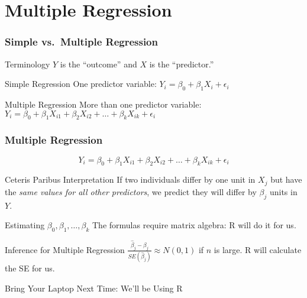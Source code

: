 \section{Multiple Regression}
\begin{frame}
\frametitle{Simple vs.\ Multiple Regression}
\begin{block}{Terminology}
$Y$ is the ``outcome'' and $X$ is the ``predictor.''
\end{block}

\begin{block}{Simple Regression}
One predictor variable: $Y_i = \beta_0 + \beta_1 X_i + \epsilon_i$
\end{block}
\begin{block}{Multiple Regression}
More than one predictor variable: $Y_i = \beta_0 + \beta_1 X_{i1} + \beta_2 X_{i2} +  \hdots + \beta_k X_{ik} + \epsilon_i$
\end{block}



\end{frame}


\begin{frame}
\frametitle{Multiple Regression}
$$Y_i = \beta_0 + \beta_1 X_{i1} + \beta_2 X_{i2} +  \hdots + \beta_k X_{ik} + \epsilon_i$$

\begin{block}{Ceteris Paribus Interpretation}
  If two individuals differ by one unit in $X_j$ but have the \emph{same values for all other predictors}, we predict they will differ by $\beta_j$ units in $Y$.
\end{block}

\begin{block}{Estimating $\beta_0, \beta_1, \dots, \beta_k$}
  The formulas require matrix algebra: R will do it for us.
\end{block}

\begin{block}{Inference for Multiple Regression}
$\displaystyle\frac{\widehat{\beta}_j - \beta_j}{\widehat{SE}(\widehat{\beta}_j)} \approx N(0,1)$ if $n$ is large. 
R will calculate the SE for us.
\end{block}

\end{frame}

\begin{frame}
\begin{center}
\Huge Bring Your Laptop Next Time: We'll be Using R
\end{center}

\end{frame}

